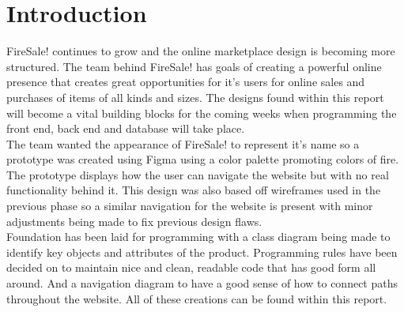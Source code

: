 \section{Introduction}

FireSale! continues to grow and the online marketplace design is becoming more structured. The team behind FireSale! has goals of creating a powerful online presence that creates great opportunities for it's users for online sales and purchases of items of all kinds and sizes. The designs found within this report will become a vital building blocks for the coming weeks when programming the front end, back end and database will take place. \\

 The team wanted the appearance of FireSale! to represent it's name so a prototype was created using Figma using a color palette promoting colors of fire. The prototype displays how the user can navigate the website but with no real functionality behind it. This design was also based off wireframes used in the previous phase so a similar navigation for the website is present with minor adjustments being made to fix previous design flaws. \\

 Foundation has been laid for programming with a class diagram being made to identify key objects and attributes of the product. Programming rules have been decided on to maintain nice and clean, readable code that has good form all around. And a navigation diagram to have a good sense of how to connect paths throughout the website. All of these creations can be found within this report. 